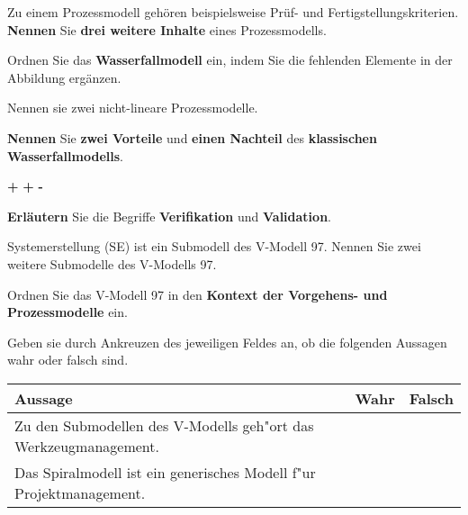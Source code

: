 \documentclass[12pt]{exam}
\begin{document}
\begin{questions}
\question[3] Zu einem Prozessmodell gehören beispielsweise Prüf- und Fertigstellungskriterien. \textbf{Nennen} Sie \textbf{drei weitere Inhalte} eines Prozessmodells.
\addpoints

\question[2] Ordnen Sie das \textbf{Wasserfallmodell} ein, indem Sie die fehlenden Elemente in der Abbildung ergänzen. \\
\addpoints
{}

\question[2] Nennen sie zwei nicht-lineare Prozessmodelle.
\addpoints

\question[3] \textbf{Nennen} Sie \textbf{zwei Vorteile} und \textbf{einen Nachteil} des \textbf{klassischen Wasserfallmodells}.
\addpoints
{
\checkboxchar{ }
\begin{checkboxes}
    \choice \textbf{+}
    \choice \textbf{+}
    \choice \textbf{-}
\end{checkboxes}
}

\question[4] \textbf{Erläutern} Sie die Begriffe \textbf{Verifikation} und \textbf{Validation}.
\addpoints

\question[2] Systemerstellung (SE)  ist ein Submodell des V-Modell 97. Nennen Sie zwei weitere Submodelle des V-Modells 97.
\addpoints

\question[2] Ordnen Sie das V-Modell 97 in den \textbf{Kontext der Vorgehens- und Prozessmodelle} ein.
\addpoints

\question[2] Geben sie durch Ankreuzen des jeweiligen Feldes an, ob die folgenden Aussagen wahr oder falsch sind. \\
\addpoints
\begin{tabular}{| p{12cm} | c | c |} \hline
    Aussage & Wahr & Falsch \\ \hline
    Zu den Submodellen des V-Modells geh"ort das Werkzeugmanagement. & & \\ \hline
    Das Spiralmodell ist ein generisches Modell f"ur Projektmanagement. & & \\ \hline
\end{tabular}


\end{questions}
\end{document}
